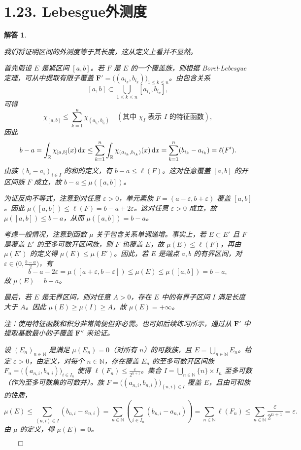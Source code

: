 \documentclass[12pt,UTF8]{ctexbook}
\theoremstyle{exercisestyle}
\theoremstyle{solutionstyle}
\newtheorem*{solution*}{解答}
\newenvironment{solution}
  {\begin{solution*}}
  {\hfill\ensuremath{\qed}\end{solution*}}
\begin{document}
\section{1.23. Lebesgue外测度}
\begin{solution}
\begin{subquestions}
\item 我们将证明区间的外测度等于其长度，这从定义上看并不显然。

首先假设 \(E\) 是紧区间 \([a, b]\)。若 \(F\) 是 \(E\) 的一个覆盖族，则根据 Borel-Lebesgue 定理，可从中提取有限子覆盖 \(\mathbf{F}' = \bigl((a_{i_k}, b_{i_k})\bigr)_{1 \leq k \leq n}\)。由包含关系
\[
[a, b] \subset \bigcup_{1 \leq k \leq n} [a_{i_k}, b_{i_k}],
\]
可得
\[
\chi_{[a,b]} \leq \sum_{k=1}^{n} \chi_{(a_{i_k}, b_{i_k})} \quad (\text{其中 } \chi_{I} \text{ 表示 } I \text{ 的特征函数}),
\]
因此
\[
b - a = \int_{\mathbb{R}} \chi_{[a,b]}(x) \,\mathrm{d}x \leq \sum_{k=1}^{n} \int_{\mathbb{R}} \chi_{(a_{i_k}, b_{i_k})}(x) \,\mathrm{d}x = \sum_{k=1}^{n} (b_{i_k} - a_{i_k}) = \ell(F').
\]
由族 \((b_i - a_i)_{i \in I}\) 的和的定义，有 \(b - a \leq \ell(F)\)。这对任意覆盖 \([a, b]\) 的开区间族 \(F\) 成立，故 \(b - a \leq \mu([a, b])\)。

为证反向不等式，注意到对任意 \(\varepsilon > 0\)，单元素族 \(F = (a - \varepsilon, b + \varepsilon)\) 覆盖 \([a, b]\)。因此 \(\mu([a, b]) \leq \ell(F) = b - a + 2\varepsilon\)。这对任意 \(\varepsilon > 0\) 成立，故 \(\mu([a, b]) \leq b - a\)，从而 \(\mu([a, b]) = b - a\)。

考虑一般情况，注意到函数 \(\mu\) 关于包含关系单调递增。事实上，若 \(E \subset E'\) 且 \(F\) 是覆盖 \(E'\) 的至多可数开区间族，则 \(F\) 也覆盖 \(E\)，故 \(\mu(E) \leq \ell(F)\)，再由 \(\mu(E')\) 的定义得 \(\mu(E) \leq \mu(E')\)。因此，若 \(E\) 是端点 \(a, b\) 的有界区间，对 \(\varepsilon \in \bigl(0, \frac{b-a}{2}\bigr)\)，有
\[
b - a - 2\varepsilon = \mu([a + \varepsilon, b - \varepsilon]) \leq \mu(E) \leq \mu([a, b]) = b - a,
\]
故 \(\mu(E) = b - a\)。

最后，若 \(E\) 是无界区间，则对任意 \(A > 0\)，存在 \(E\) 中的有界子区间 \(I\) 满足长度大于 \(A\)。因此 \(\mu(E) \geq \mu(I) \geq A\)，故 \(\mu(E) = +\infty\)。

注：使用特征函数和积分非常简便但非必需。也可如后续练习所示，通过从 \(\mathbf{F}'\) 中提取基数最小的子覆盖 \(\mathbf{F}''\) 来论证。

\item 设 \((E_n)_{n \in \mathbb{N}}\) 是满足 \(\mu(E_n) = 0\)（对所有 \(n\)）的可数族，且 \(E = \bigcup_{n \in \mathbb{N}} E_n\)。给定 \(\varepsilon > 0\)，由定义，对每个 \(n \in \mathbb{N}\)，存在覆盖 \(E_n\) 的至多可数开区间族 \(F_n = \bigl((a_{n,i}, b_{n,i})\bigr)_{i \in I_n}\) 使得 \(\ell(F_n) \leq \frac{\varepsilon}{2^{n+1}}\)。集合 \(I = \bigcup_{n \in \mathbb{N}} \{n\} \times I_n\) 至多可数（作为至多可数集的可数并）。族 \(F = \bigl((a_{n,i}, b_{n,i})\bigr)_{(n,i) \in I}\) 覆盖 \(E\)，且由可和族的性质，
\[
\mu(E) \leqslant \sum_{(n,i) \in I} (b_{n,i} - a_{n,i}) = \sum_{n \in \mathbb{N}} \left( \sum_{i \in I_n} (b_{n,i} - a_{n,i}) \right) = \sum_{n \in \mathbb{N}} \ell(F_n) \leqslant \sum_{n \in \mathbb{N}} \frac{\varepsilon}{2^{n+1}} = \varepsilon.
\]
由 \(\mu\) 的定义，得 \(\mu(E) = 0\)。


\end{subquestions}
\end{solution}
\end{document}
